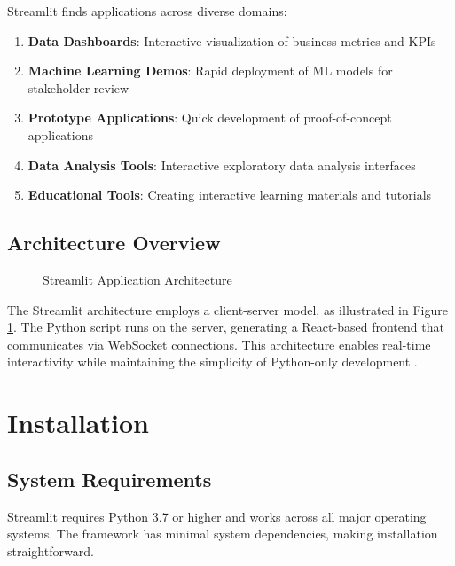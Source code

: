 Streamlit finds applications across diverse domains:

\begin{enumerate}
	\item \textbf{Data Dashboards}: Interactive visualization of business metrics and KPIs
	\item \textbf{Machine Learning Demos}: Rapid deployment of ML models for stakeholder review
	\item \textbf{Prototype Applications}: Quick development of proof-of-concept applications
	\item \textbf{Data Analysis Tools}: Interactive exploratory data analysis interfaces
	\item \textbf{Educational Tools}: Creating interactive learning materials and tutorials
\end{enumerate}

\subsection{Architecture Overview}
\label{subsec:architecture}

\begin{figure}[H]
	\centering
	
	\caption{Streamlit Application Architecture \cite{Streamlit:2024}}
	\label{fig:streamlit_architecture}
\end{figure}

The Streamlit architecture employs a client-server model, as illustrated in Figure \ref{fig:streamlit_architecture}. The Python script runs on the server, generating a React-based frontend that communicates via WebSocket connections. This architecture enables real-time interactivity while maintaining the simplicity of Python-only development \cite{Streamlit:2024}.

\clearpage

\section{Installation}
\label{sec:installation}

\subsection{System Requirements}
\label{subsec:system_requirements}

Streamlit requires Python 3.7 or higher and works across all major operating systems. The framework has minimal system dependencies, making installation straightforward.

